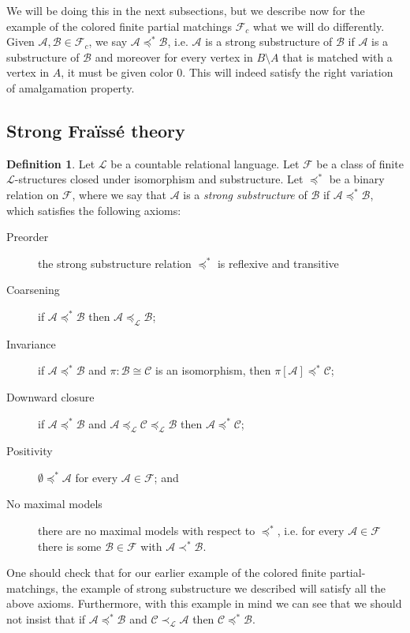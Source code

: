 \documentclass[12pt]{amsart}
\theoremstyle{plain}
\theoremstyle{definition}
\newtheorem{definition}[theorem]{Definition}
\newcommand{\isom}{\cong}
\newcommand{\mcA}{\mathcal{A}}
\newcommand{\mcB}{\mathcal{B}}
\newcommand{\mcC}{\mathcal{C}}
\newcommand{\mcF}{\mathcal{F}}
\newcommand{\mcL}{\mathcal{L}}
\begin{document}
We will be doing this in the next subsections, but we describe now for the example of the colored finite partial matchings $\mcF_c$ what we will do differently.
Given $\mcA, \mcB \in \mcF_c$, we say $\mcA \preceq^* \mcB$, i.e. $\mcA$ is a strong substructure of $\mcB$ if $\mcA$ is a substructure of $\mcB$ and moreover for every vertex in $B \setminus A$ that is matched with a vertex in $A$, it must be given color 0.
This will indeed satisfy the right variation of amalgamation property.

\subsection{Strong Fra\"{i}ss\'{e} theory}

\begin{definition}\label{def:strong_substructure}
Let $\mcL$ be a countable relational language.
Let $\mcF$ be a class of finite $\mcL$-structures closed under isomorphism and substructure.
Let $\preceq^*$ be a binary relation on $\mcF$, where we say that $\mcA$ is a \emph{strong substructure} of $\mcB$ if $\mcA \preceq^* \mcB$, which satisfies the following axioms:
\begin{description}
    \item[Preorder]\label{strong:preorder} the strong substructure relation $\preceq^*$ is reflexive and transitive
    \item[Coarsening]\label{strong:coarsening} if $\mcA \preceq^* \mcB$ then $\mcA \preceq_{\mcL} \mcB$;
    \item[Invariance]\label{strong:invariance} if $\mcA \preceq^* \mcB$ and $\pi : \mcB \isom \mcC$ is an isomorphism, then $\pi[\mcA] \preceq^* \mcC$;
    \item[Downward closure]\label{strong:downward_closure} if $\mcA \preceq^* \mcB$ and $\mcA \preceq_\mcL \mcC \preceq_\mcL \mcB$ then $\mcA \preceq^* \mcC$;
    \item[Positivity]\label{strong:positivity} $\emptyset \preceq^* \mcA$ for every $\mcA \in \mcF$; and
    \item[No maximal models]\label{strong:nmm} there are no maximal models with respect to $\preceq^*$, i.e. for every $\mcA \in \mcF$ there is some $\mcB \in \mcF$ with $\mcA \prec^* \mcB$.
\end{description}
\end{definition}

One should check that for our earlier example of the colored finite partial-matchings, the example of strong substructure we described will satisfy all the above axioms.
Furthermore, with this example in mind we can see that we should not insist that if $\mcA \preceq^* \mcB$ and $\mcC \prec_\mcL \mcA$ then $\mcC \preceq^* \mcB$.
\end{document}
